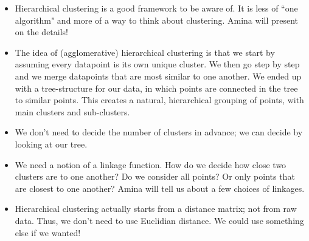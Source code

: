 \begin{itemize}
\item Hierarchical clustering is a good framework to be aware of. It is less of ``one algorithm" and more of a way to think about clustering. Amina will present on the details!
\item The idea of (agglomerative) hierarchical clustering is that we start by assuming every datapoint is its own unique cluster. We then go step by step and we merge datapoints that are most similar to one another. We ended up with a tree-structure for our data, in which points are connected in the tree to similar points. This creates a natural, hierarchical grouping of points, with main clusters and sub-clusters.
\item We don't need to decide the number of clusters in advance; we can decide by looking at our tree. 
\item We need a notion of a linkage function. How do we decide how close two clusters are to one another? Do we consider all points? Or only points that are closest to one another? Amina will tell us about a few choices of linkages.
\item Hierarchical clustering actually starts from a distance matrix; not from raw data. Thus, we don't need to use Euclidian distance. We could use something else if we wanted!
\end{itemize}

